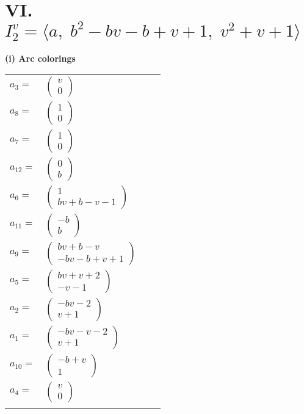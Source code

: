 \documentclass[1p]{elsarticle_modified}
\theoremstyle{definition}
\begin{document}
\centering \section*{VI. $I^v_{2}= \langle a,\;b^2- b v- b+v+1,\;v^2+v+1 \rangle$}
\flushleft \textbf{(i) Arc colorings}\\
\begin{tabular}{m{7pt} m{180pt} m{7pt} m{180pt} }
\flushright $a_{3}=$&$\begin{pmatrix}v\\0\end{pmatrix}$ \\
\flushright $a_{8}=$&$\begin{pmatrix}1\\0\end{pmatrix}$ \\
\flushright $a_{7}=$&$\begin{pmatrix}1\\0\end{pmatrix}$ \\
\flushright $a_{12}=$&$\begin{pmatrix}0\\b\end{pmatrix}$ \\
\flushright $a_{6}=$&$\begin{pmatrix}1\\b v+b- v-1\end{pmatrix}$ \\
\flushright $a_{11}=$&$\begin{pmatrix}- b\\b\end{pmatrix}$ \\
\flushright $a_{9}=$&$\begin{pmatrix}b v+b- v\\- b v- b+v+1\end{pmatrix}$ \\
\flushright $a_{5}=$&$\begin{pmatrix}b v+v+2\\- v-1\end{pmatrix}$ \\
\flushright $a_{2}=$&$\begin{pmatrix}- b v-2\\v+1\end{pmatrix}$ \\
\flushright $a_{1}=$&$\begin{pmatrix}- b v- v-2\\v+1\end{pmatrix}$ \\
\flushright $a_{10}=$&$\begin{pmatrix}- b+v\\1\end{pmatrix}$ \\
\flushright $a_{4}=$&$\begin{pmatrix}v\\0\end{pmatrix}$\\&\end{tabular}
\end{document}
